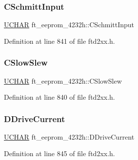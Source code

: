 \subsubsection{\texorpdfstring{C\+Schmitt\+Input}{CSchmittInput}}
{\footnotesize\ttfamily \hyperlink{CatCaloProto40MHz_2inc_2WinTypes_8h_a4f4bb67531a9bf6f0b9c6ad76aeba587}{U\+C\+H\+AR} ft\+\_\+eeprom\+\_\+4232h\+::\+C\+Schmitt\+Input}



Definition at line 841 of file ftd2xx.\+h.

\mbox{\label{structft__eeprom__4232h_a6d92eb606cbe5c251751cd2d6fd8bebe}} 
\subsubsection{\texorpdfstring{C\+Slow\+Slew}{CSlowSlew}}
{\footnotesize\ttfamily \hyperlink{CatCaloProto40MHz_2inc_2WinTypes_8h_a4f4bb67531a9bf6f0b9c6ad76aeba587}{U\+C\+H\+AR} ft\+\_\+eeprom\+\_\+4232h\+::\+C\+Slow\+Slew}



Definition at line 840 of file ftd2xx.\+h.

\mbox{\label{structft__eeprom__4232h_a36cb4f439c051c485013966f16adc5ab}} 
\subsubsection{\texorpdfstring{D\+Drive\+Current}{DDriveCurrent}}
{\footnotesize\ttfamily \hyperlink{CatCaloProto40MHz_2inc_2WinTypes_8h_a4f4bb67531a9bf6f0b9c6ad76aeba587}{U\+C\+H\+AR} ft\+\_\+eeprom\+\_\+4232h\+::\+D\+Drive\+Current}



Definition at line 845 of file ftd2xx.\+h.

\mbox{\label{structft__eeprom__4232h_a686ad080f8c280b2ca149233f584fb29}} 
